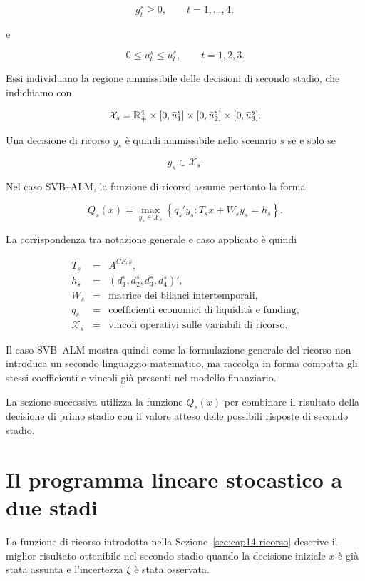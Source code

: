 \[
g_t^s\geq0,
\qquad
t=1,\ldots,4,
\]

\noindent e

\[
0\leq u_t^s\leq\bar u_t^s,
\qquad
t=1,2,3.
\]

Essi individuano la regione ammissibile delle decisioni di secondo stadio,
che indichiamo con

\[
\mathcal X_s
=
\mathbb{R}_+^4
\times
[0,\bar u_1^s]
\times
[0,\bar u_2^s]
\times
[0,\bar u_3^s].
\]

Una decisione di ricorso $y_s$ \`e quindi ammissibile nello scenario $s$
se e solo se

\[
y_s\in\mathcal X_s.
\]

Nel caso SVB--ALM, la funzione di ricorso assume pertanto la forma

\[
Q_s(x)
=
\max_{y_s\in\mathcal X_s}
\left\{
q_s'y_s:
T_sx+W_sy_s=h_s
\right\}.
\]

La corrispondenza tra notazione generale e caso applicato \`e quindi

\[
\begin{array}{ccl}
T_s & = & A^{CF,s},\\[0.1cm]
h_s & = & (d_1^s,d_2^s,d_3^s,d_4^s)',\\[0.1cm]
W_s & = & \text{matrice dei bilanci intertemporali},\\[0.1cm]
q_s & = & \text{coefficienti economici di liquidit\`a e funding},\\[0.1cm]
\mathcal X_s & = & \text{vincoli operativi sulle variabili di ricorso}.
\end{array}
\]

Il caso SVB--ALM mostra quindi come la formulazione generale del ricorso non introduca un secondo linguaggio matematico, ma raccolga in
forma compatta gli stessi coefficienti e vincoli gi\`a presenti nel
modello finanziario.

La sezione successiva utilizza la funzione $Q_s(x)$ per combinare il
risultato della decisione di primo stadio con il valore atteso delle
possibili risposte di secondo stadio.

\section{Il programma lineare stocastico a due stadi}

\label{sec:cap14-programma-due-stadi}

La funzione di ricorso introdotta nella Sezione~\ref{sec:cap14-ricorso}
descrive il miglior risultato ottenibile nel secondo stadio quando la
decisione iniziale $x$ \`e gi\`a stata assunta e l'incertezza $\xi$ \`e stata
osservata.

